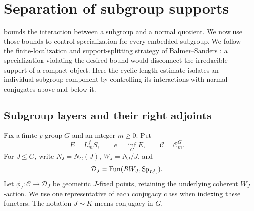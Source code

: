 \section{Separation of subgroup supports}\label{sec:support}

 bounds the interaction between a subgroup and a
normal quotient. We now use those bounds to control specialization for every
embedded subgroup. We follow the finite-localization and support-splitting
strategy of Balmer--Sanders \cite[proof of Theorem~9.1, \textup{(B)}
$\Rightarrow$\textup{(A)}]{BS}: a specialization violating the desired bound
would disconnect the irreducible support of a compact object. Here the
cyclic-length estimate isolates an individual subgroup component by
controlling its interactions with normal conjugates above and below it.

\subsection{Subgroup layers and their right adjoints}

Fix a finite \(p\)-group \(G\) and an integer \(m\ge0\). Put
\[
 E=L_m^fS,\qquad e=\operatorname{inf}_G E,
 \qquad \mathcal C=\mathcal C_m^G.
\]
For \(J\le G\), write \(N_J=N_G(J)\), \(W_J=N_J/J\), and
\[
 \mathcal D_J=\operatorname{Fun}(BW_J,\mathrm{Sp}_{L_m^f}).
\]
Let \(\phi_J:\mathcal C\to\mathcal D_J\) be geometric \(J\)-fixed points,
retaining the underlying coherent \(W_J\)-action. We use one representative
of each conjugacy class when indexing these functors. The notation
\(J\sim K\) means conjugacy in \(G\).

